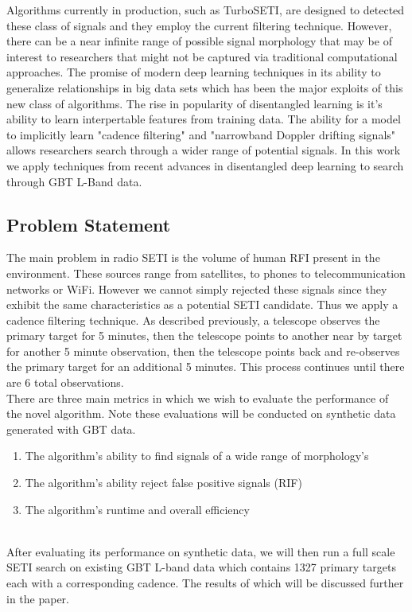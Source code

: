 \documentclass{article}
\begin{document}
Algorithms currently in production, such as TurboSETI, are designed to detected these class of signals and they employ the current filtering technique. However, there can be a near infinite range of possible signal morphology that may be of interest to researchers that might not be captured via traditional computational approaches. The promise of modern deep learning techniques in its ability to generalize relationships in big data sets which has been the major exploits of this new class of algorithms. The rise in popularity of disentangled learning is it's ability to learn interpertable features from training data. The ability for a model to implicitly learn "cadence filtering" and "narrowband Doppler drifting signals" allows researchers search through a wider range of potential signals. In this work we apply techniques from recent advances in
disentangled deep learning to search through GBT L-Band data.


\subsection{Problem Statement}
The main problem in radio SETI is the volume of human RFI present in the environment. These sources range from satellites, to phones to telecommunication networks or WiFi. However we cannot simply rejected these signals since they exhibit the same characteristics as a potential SETI candidate. Thus we apply a cadence filtering technique. As described previously, a telescope observes the primary target for 5 minutes, then the telescope points to another near by target for another 5 minute observation, then the telescope points back and re-observes the primary target for an additional 5 minutes. This process continues until there are 6 total observations. \\

There are three main metrics in which we wish to evaluate the performance of the novel algorithm. 
Note these evaluations will be conducted on synthetic data generated with GBT data.
\begin{enumerate}
    \item {The algorithm's ability to find signals of a wide range of morphology's}
    \item{ The algorithm's ability reject false positive signals (RIF)}
    \item{The algorithm's runtime and overall efficiency }
\end{enumerate}
\\
After evaluating its performance on synthetic data, we will then run a full scale SETI search on existing GBT L-band data which contains 1327 primary targets each with a corresponding cadence. The results of which will be discussed further in the paper.
\end{document}
